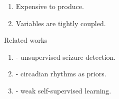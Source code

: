 \documentclass[t]{beamer}
\theoremstyle{definition}
\begin{document}
\begin{frame}
{\begin{tikzpicture}
        

    \end{tikzpicture}
    }
    \begin{enumerate}
         \item<alert@+-> Expensive to produce.
         \item<alert@+-> Variables are tightly coupled.
    \end{enumerate}

     {
    \begin{block}{Related works}
        \begin{enumerate}
            \item \cite{gardner2006one} - unsupervised seizure detection.
            \item \cite{karoly2017circadian} - circadian rhythms as priors.
            \item \cite{yang2022weak} - weak self-supervised learning.
        \end{enumerate}
    \end{block}

    }
    

\end{frame}
\end{document}

